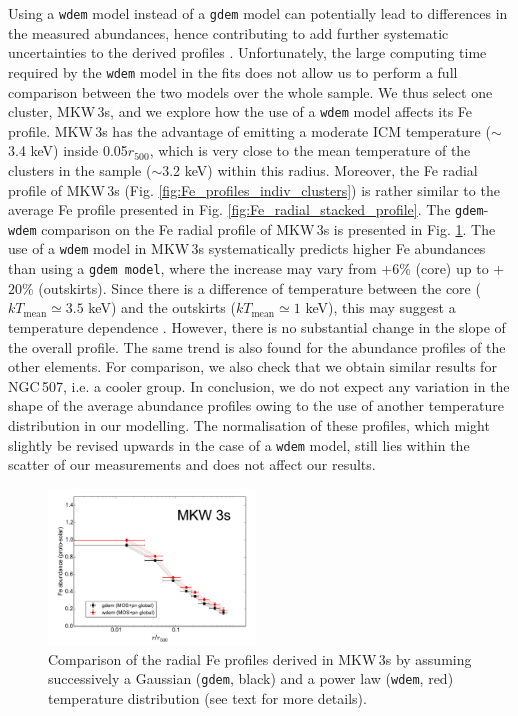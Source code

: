 \documentclass{aa}
\begin{document}
Using a \texttt{wdem} model instead of a \texttt{gdem} model can potentially lead to differences in the measured abundances, hence contributing to add further systematic uncertainties to the derived profiles \citep[for a RGS comparison, see][]{dePlaa2017}. Unfortunately, the large computing time required by the \texttt{wdem} model in the fits does not allow us to perform a full comparison between the two models over the whole sample. We thus select one cluster, MKW\,3s, and we explore how the use of a \texttt{wdem} model affects its Fe profile. MKW\,3s has the advantage of emitting a moderate ICM temperature ($\sim$3.4 keV) inside 0.05$r_{500}$, which is very close to the mean temperature of the clusters in the sample ($\sim$3.2 keV) within this radius. Moreover, the Fe radial profile of MKW\,3s (Fig. \ref{fig:Fe_profiles_indiv_clusters}) is rather similar to the average Fe profile presented in Fig. \ref{fig:Fe_radial_stacked_profile}. The \texttt{gdem}-\texttt{wdem} comparison on the Fe radial profile of MKW\,3s is presented in Fig. \ref{fig:MKW3s_gdem_wdem}.
The use of a \texttt{wdem} model in MKW\,3s systematically predicts higher Fe abundances than using a \texttt{gdem model}, where the increase may vary from +$6\%$ (core) up to +$20\%$ (outskirts). Since there is a difference of temperature between the core ($kT_\text{mean} \simeq 3.5$ keV) and the outskirts ($kT_\text{mean} \simeq 1$ keV), this may suggest a temperature dependence \citep[see also][]{dePlaa2017}. However, there is no substantial change in the slope of the overall profile. The same trend is also found for the abundance profiles of the other elements. For comparison, we also check that we obtain similar results for NGC\,507, i.e. a cooler group. In conclusion, we do not expect any variation in the shape of the average abundance profiles owing to the use of another temperature distribution in our modelling. The normalisation of these profiles, which might slightly be revised upwards in the case of a \texttt{wdem} model, still lies within the scatter of our measurements and does not affect our results.

\begin{figure}[!]
        \centering
                \includegraphics[width=0.49\textwidth]{fig_MKW3s_gdem_wdem.pdf}

        \caption{Comparison of the radial Fe profiles derived in MKW\,3s by assuming successively a Gaussian (\texttt{gdem}, black) and a power law (\texttt{wdem}, red) temperature distribution (see text for more details).}
\label{fig:MKW3s_gdem_wdem}
\end{figure}
\end{document}
